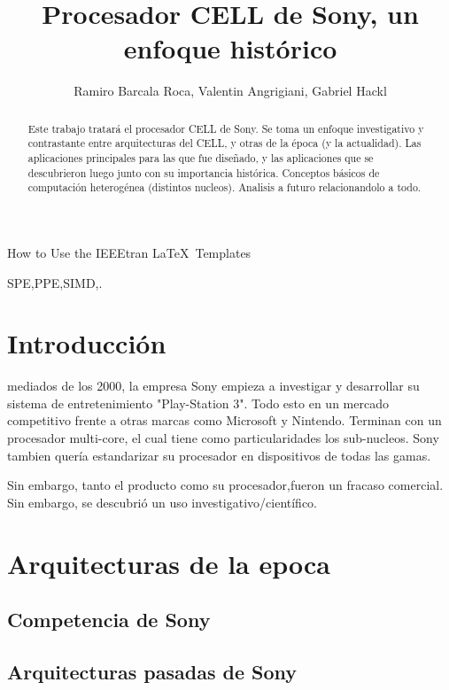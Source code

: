 \documentclass[11pt,compsoc]{IEEEtran}
\begin{document}
	\title{Procesador CELL de Sony, un enfoque histórico}
	\author{Ramiro Barcala Roca, Valentin Angrigiani, Gabriel Hackl}
		
	{How to Use the IEEEtran \LaTeX \ Templates}
	\maketitle
	
	\begin{abstract}
		Este trabajo tratará el procesador CELL de Sony. Se toma un enfoque investigativo y contrastante entre arquitecturas del CELL, y otras de la época (y la actualidad). Las aplicaciones principales para las que fue diseñado, y las aplicaciones que se descubrieron luego junto  con su importancia histórica. Conceptos básicos de computación heterogénea (distintos nucleos). Analisis a futuro relacionandolo a todo.
	\end{abstract}
	
	\begin{IEEEkeywords}
		SPE,PPE,SIMD,.
	\end{IEEEkeywords}
	
	\section{Introducción}
	 mediados de los 2000, la empresa Sony empieza a investigar y desarrollar su sistema de entretenimiento "Play-Station 3". Todo esto en un mercado competitivo frente a otras marcas como Microsoft y Nintendo. Terminan con un procesador multi-core, el cual tiene como particularidades los sub-nucleos. Sony tambien quería estandarizar su procesador en dispositivos de todas las gamas.
	
	Sin embargo, tanto el producto como su procesador,fueron un fracaso comercial. Sin embargo, se descubrió un uso investigativo/científico.
	
	
	\section{Arquitecturas de la epoca}
	\noindent 
	
	\subsection{Competencia de Sony}
	\noindent 
	
	\subsection{Arquitecturas pasadas de Sony}
	\noindent 
	
\end{document}
